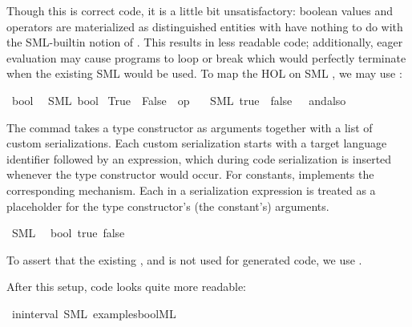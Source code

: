 \begin{isabellebody}
\begin{isamarkuptext}
  Though this is correct code, it is a little bit unsatisfactory:
  boolean values and operators are materialized as distinguished
  entities with have nothing to do with the SML-builtin notion
  of .  This results in less readable code;
  additionally, eager evaluation may cause programs to
  loop or break which would perfectly terminate when
  the existing SML  would be used.  To map
  the HOL  on SML , we may use
  :%
\end{isamarkuptext}%
\isamarkuptrue%
\isamarkupfalse%
\ bool\isanewline
\ \ {\isacharparenleft}SML\ {\isachardoublequoteopen}bool{\isachardoublequoteclose}{\isacharparenright}\isanewline
{}\isamarkupfalse%
\ True\ \ False\ \ {\isachardoublequoteopen}op\ {\isasymand}{\isachardoublequoteclose}\isanewline
\ \ {\isacharparenleft}SML\ {\isachardoublequoteopen}true{\isachardoublequoteclose}\ \ {\isachardoublequoteopen}false{\isachardoublequoteclose}\ \ {\isachardoublequoteopen}{\isacharunderscore}\ andalso\ {\isacharunderscore}{\isachardoublequoteclose}{\isacharparenright}%
\begin{isamarkuptext}%
The \isasymCODETYPE commad takes a type constructor
  as arguments together with a list of custom serializations.
  Each custom serialization starts with a target language
  identifier followed by an expression, which during
  code serialization is inserted whenever the type constructor
  would occur.  For constants, \isasymCODECONST implements
  the corresponding mechanism.  Each \qt{\_} in
  a serialization expression is treated as a placeholder
  for the type constructor's (the constant's) arguments.%
\end{isamarkuptext}%
\isamarkuptrue%
\isamarkupfalse%
\ SML\isanewline
\ \ bool\ true\ false%
\begin{isamarkuptext}%
To assert that the existing ,  and 
  is not used for generated code, we use \isasymCODERESERVED.

  After this setup, code looks quite more readable:%
\end{isamarkuptext}%
\isamarkuptrue%
\isamarkupfalse%
\ in{\isacharunderscore}interval\ {\isacharparenleft}SML\ {\isachardoublequoteopen}examples{\isacharslash}bool{}{\isachardot}ML{\isachardoublequoteclose}{\isacharparenright}%
\begin{isamarkuptext}%


\end{isamarkuptext}
\end{isabellebody}
